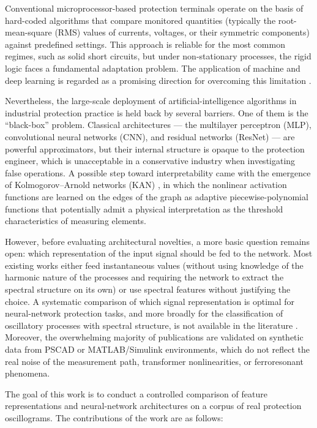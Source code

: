 \documentclass{ieeeojies}
\begin{document}
Conventional microprocessor-based protection terminals operate on the basis of hard-coded algorithms that compare monitored quantities (typically the root-mean-square (RMS) values of currents, voltages, or their symmetric components) against predefined settings. This approach is reliable for the most common regimes, such as solid short circuits, but under non-stationary processes, the rigid logic faces a fundamental adaptation problem. The application of machine and deep learning is regarded as a promising direction for overcoming this limitation \cite{ref2}.

Nevertheless, the large-scale deployment of artificial-intelligence algorithms in industrial protection practice is held back by several barriers. One of them is the ``black-box'' problem. Classical architectures — the multilayer perceptron (MLP), convolutional neural networks (CNN), and residual networks (ResNet) — are powerful approximators, but their internal structure is opaque to the protection engineer, which is unacceptable in a conservative industry when investigating false operations. A possible step toward interpretability came with the emergence of Kolmogorov–Arnold networks (KAN) \cite{ref3}, in which the nonlinear activation functions are learned on the edges of the graph as adaptive piecewise-polynomial functions that potentially admit a physical interpretation as the threshold characteristics of measuring elements.

However, before evaluating architectural novelties, a more basic question remains open: which representation of the input signal should be fed to the network. Most existing works either feed instantaneous values (without using knowledge of the harmonic nature of the processes and requiring the network to extract the spectral structure on its own) or use spectral features without justifying the choice. A systematic comparison of which signal representation is optimal for neural-network protection tasks, and more broadly for the classification of oscillatory processes with spectral structure, is not available in the literature \cite{ref4, ref5}. Moreover, the overwhelming majority of publications are validated on synthetic data from PSCAD or MATLAB/Simulink environments, which do not reflect the real noise of the measurement path, transformer nonlinearities, or ferroresonant phenomena.

The goal of this work is to conduct a controlled comparison of feature representations and neural-network architectures on a corpus of real protection oscillograms. The contributions of the work are as follows:
\end{document}

